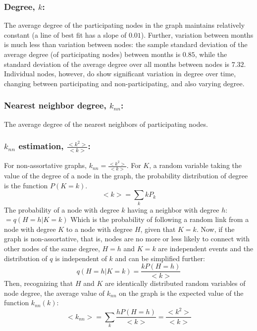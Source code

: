 \documentclass[12pt]{article}
\begin{document}
\subsubsection*{Degree, \(k\):}

The average degree of the participating nodes in the graph maintains relatively constant (a line of best fit has a slope of \(0.01\)). Further, variation between months is much less than variation between nodes: the sample standard deviation of the average degree (of participating nodes) between months is \(0.85\), while the standard deviation of the average degree over all months between nodes is \(7.32\). Individual nodes, however, do show significant variation in degree over time, changing between participating and non-participating, and also varying degree.

\subsubsection*{Nearest neighbor degree, \(k_{nn}\):}

The average degree of the nearest neighbors of participating nodes. 

\subsubsection*{\(k_{nn}\) estimation, \(\frac{<k^2>}{<k>}\):}

For non-assortative graphs, \(k_{nn} = \frac{<k^2>}{<k>}\).
For \(K\), a random variable taking the value of the degree of a node in the graph, the probability distribution of degree is the function \(P(K = k)\).
\[<k> = \sum_k kP_k\]
The probability of a node with degree \(k\) having a neighbor with degree \(h\): \( = q(H = h | K = k)\)
Which is the probability of following a random link from a node with degree \(K\) to a node with degree \(H\), given that \(K = k\). Now, if  the graph is non-assortative, that is, nodes are no more or less likely to connect with other nodes of the same degree, \(H = h\) and \(K = k\) are independent events and the distribution of \(q\) is independent of \(k\) and can be simplified further:
\[ q(H = h | K = k) = \frac{ k P(H = h)}{<k>}\]
Then, recognizing that \(H\) and \(K\) are identically distributed random variables of node degree, the average value of \(k_{nn}\) on the graph is the expected value of the function \(k_{nn}(k)\):
\[<k_{nn}> = \sum_{k} \frac{ h P(H = h)}{<k>} =  \frac{<k^2>}{<k>}  \]
\end{document}
